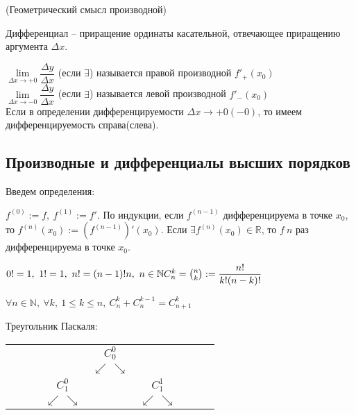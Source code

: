 \begin{multicols}{2}
\begin{theorema}{(Геометрический смысл производной)}{}
    \end{theorema}
    \begin{note}{}{} 
        Дифференциал -- приращение ординаты касательной, отвечающее приращению аргумента $\Delta x$.
    \end{note}
    \begin{definition}{}{} $\lim\limits_{\Delta x \to +0} \dfrac{\Delta y}{\Delta x}$ (если $\exists$) называется правой производной $f'_+(x_0)$
    \\$\lim\limits_{\Delta x \to -0} \dfrac{\Delta y}{\Delta x}$ (если $\exists$) называется левой производной $f'_-(x_0)$
    \\Если в определении дифференцируемости $\Delta x \to + 0 (-0)$, то имеем  дифференцируемость справа(слева).
    \end{definition}
    \subsection*{Производные и дифференциалы высших порядков}
    Введем определения:
    \begin{definition}{}{}
         $f^{(0)} := f,\ f^{(1)} := f'$. По индукции, если $f^{(n-1)}$ дифференцируема в точке $x_0$, то $f^{(n)} (x_0) := (f^{(n-1)})'(x_0)$. Если $\exists f^{(n)}(x_0) \in\mathbb R$, то $f\ n $ раз дифференцируема в точке $x_0$.
    \end{definition}
    \begin{definition}{}{} 
        $0! = 1,\ 1!  = 1,\ n! = (n-1)!n,\ n\in\mathbb N\\C_n^k = \binom{n}{k} := \dfrac{n!}{k!(n-k)!}$
    \end{definition}
    \begin{lemma}{}{}
         $\forall n \in\mathbb N,\ \forall k, \ 1 \leq k \leq n,\ C_n^k + C_n^{k-1} = C_{n+1}^k$
    \end{lemma}
    Треугольник Паскаля:
    \begin{center}
        \newcommand{\ap}{\ensuremath{\swarrow\,\searrow}}
        \setlength{\tabcolsep}{0pt}
        \begin{tabular}[h]{ccccccccc}
            &     &     &      & $C_0^0$   &      &      &     & \\
            &     &     &      & \ap &      &      &     & \\
            &     &     & $C_1^0$    &     &  $C_1^1$   &      &     & \\
            &     &     & \ap  &     &  \ap &      &     & \\

\end{tabular}
\end{center}
\end{multicols}
